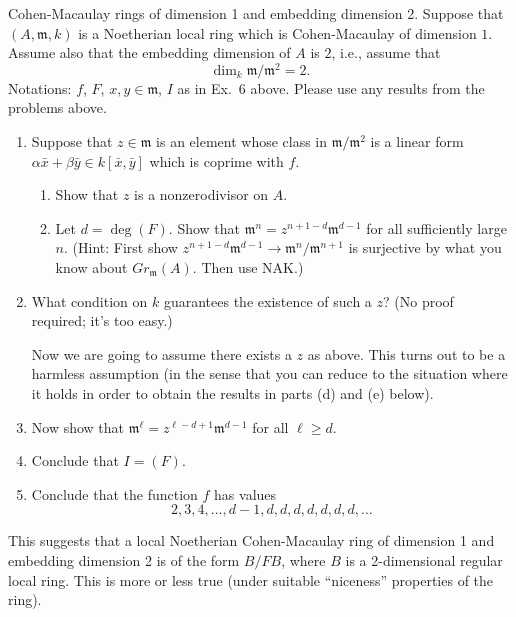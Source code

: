 \begin{exercise}
\label{exercise-CM-dim-1-embedding-dim-2}
Cohen-Macaulay rings of dimension 1 and embedding dimension 2.
Suppose that $(A, {\mathfrak m}, k)$ is a Noetherian local ring which is
Cohen-Macaulay
of dimension $1$. Assume also that the embedding dimension of $A$ is
$2$, i.e., assume that
$$
\dim_k {\mathfrak m}/{\mathfrak m}^2 = 2.
$$
Notations: $f$, $F$, $x, y\in {\mathfrak m}$, $I$ as in Ex.\ 6 above. Please
use any results from the problems above.
\begin{enumerate}
\item Suppose that $z\in {\mathfrak m}$ is an element whose class
in ${\mathfrak m}/{\mathfrak m}^2$ is a linear form
$\alpha \bar x + \beta \bar y \in k[\bar x, \bar y]$
which is coprime with $f$.
\begin{enumerate}
\item Show that $z$ is a nonzerodivisor on $A$.
\item Let $d = \deg(F)$.
Show that ${\mathfrak m}^n = z^{n + 1-d}{\mathfrak m}^{d-1}$
for all sufficiently large $n$. (Hint: First show
$z^{n + 1-d}{\mathfrak m}^{d-1} \to {\mathfrak m}^n/{\mathfrak m}^{n + 1}$
is surjective by what you know about $Gr_{\mathfrak m}(A)$. Then use NAK.)
\end{enumerate}
\item What condition on $k$ guarantees the existence of
such a $z$? (No proof required; it's too easy.)

\noindent
Now we are going to assume there exists a $z$ as above. This turns out
to be a harmless assumption (in the sense that you can reduce to
the situation where it holds in order to obtain the results in
parts (d) and (e) below).
\item Now show that ${\mathfrak m}^\ell = z^{\ell - d + 1} {\mathfrak m}^{d-1}$
for all $\ell \geq d$.
\item Conclude that $I = (F)$.
\item Conclude that the function $f$ has values
$$
2, 3, 4, \ldots, d-1, d, d, d, d, d, d, d, \ldots
$$
\end{enumerate}
\end{exercise}

\begin{remark}
\label{remark-CM-dim-1-embedding-dim-2}
This suggests that a local Noetherian Cohen-Macaulay ring of dimension 1
and embedding dimension 2 is of the form $B/FB$, where $B$ is a 2-dimensional
regular local ring. This is more or less true (under suitable ``niceness''
properties of the ring).
\end{remark}






